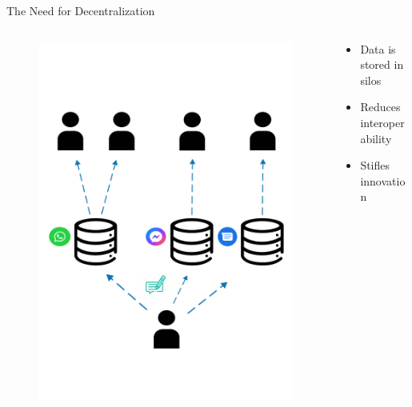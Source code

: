 \begin{frame}{The Need for Decentralization}
    \begin{columns}[T] %
        \begin{column}{.48\textwidth}
            \begin{figure}
                \centering
                \includegraphics[height = .7\textheight]{figures/bad_messages_enzo}
            \end{figure}
        \end{column}%
        \hfill%
        \begin{column}{.48\textwidth}
            \bigskip
            \begin{itemize}
                \item Data is stored in silos
                \item Reduces interoperability
                \item Stifles innovation

\end{itemize}
\end{column}
\end{columns}
\end{frame}
